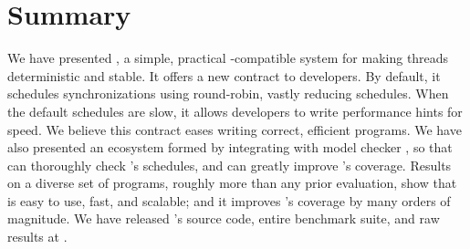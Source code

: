 \vspace{-.05in}
\section{Summary} \label{sec:tern-summary}
\vspace{-.05in}

We have presented \parrot, a simple, practical \pthread-compatible system for
making threads deterministic and stable. It offers a new contract to
developers.  By default, it schedules synchronizations using round-robin,
vastly reducing schedules.  When the default schedules are slow, it
allows developers to write performance hints for speed.  We believe this
contract eases writing correct, efficient programs.  We have
also presented an ecosystem formed by integrating \parrot with model checker
\dbug, so that \dbug can thoroughly check \parrot's schedules, and \parrot can
greatly improve \dbug's coverage.  Results on a diverse set of \nprog
programs, roughly \overeach more than any prior evaluation,
show that \parrot is easy to use, fast, and scalable; and it improves \dbug's
coverage by many orders of magnitude.  We have released \parrot's source
code, entire benchmark suite, and raw results at \github.
